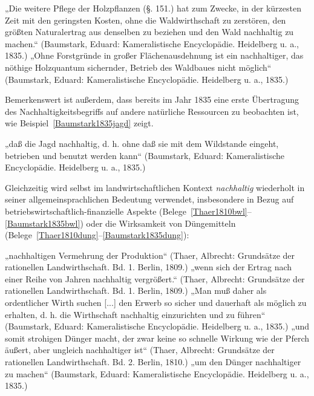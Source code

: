 \documentclass[
    german,
    a4paper,%
    12pt,%
    oneside,%
    toc=bibliography,
    final,
]{scrartcl}
\begin{document}
\begin{exe}
\ex \label{Baumstark1835forst} „Die weitere Pflege der Holzpflanzen (§. 151.) hat zum Zwecke, in der kürzesten Zeit mit den geringsten Kosten, ohne die Waldwirthschaft zu zerstören, den größten Naturalertrag aus denselben zu beziehen und den Wald nachhaltig zu machen.“ (Baumstark, Eduard: Kameralistische Encyclopädie. Heidelberg u. a., 1835.)
\ex \label{Baumstark1835forst2} „Ohne Forstgründe in großer Flächenausdehnung ist ein nachhaltiger, das nöthige Holzquantum sichernder, Betrieb des Waldbaues nicht möglich“ (Baumstark, Eduard: Kameralistische Encyclopädie. Heidelberg u. a., 1835.)
\end{exe}

Bemerkenswert ist außerdem, dass bereits im Jahr 1835 eine erste Übertragung des Nachhaltigkeitsbegriffs auf andere natürliche Ressourcen zu beobachten ist, wie Beispiel~\ref{Baumstark1835jagd} zeigt.

\begin{exe}
\ex \label{Baumstark1835jagd} „daß die Jagd nachhaltig, d. h. ohne daß sie mit dem Wildstande eingeht, betrieben und benutzt werden kann“ (Baumstark, Eduard: Kameralistische Encyclopädie. Heidelberg u. a., 1835.)
\end{exe}

Gleichzeitig wird selbst im landwirtschaftlichen Kontext \textit{nachhaltig} wiederholt in seiner allgemeinsprachlichen Bedeutung verwendet, insbesondere in Bezug auf betriebswirtschaftlich-finanzielle Aspekte (Belege~\ref{Thaer1810bwl}–\ref{Baumstark1835bwl}) oder die Wirksamkeit von Düngemitteln (Belege~\ref{Thaer1810dung}–\ref{Baumstark1835dung}):

\begin{exe}
\ex \label{Thaer1810bwl} „nachhaltigen Vermehrung der Produktion“ (Thaer, Albrecht: Grundsätze der rationellen Landwirthschaft. Bd. 1. Berlin, 1809.)
\ex „wenn sich der Ertrag nach einer Reihe von Jahren nachhaltig vergrößert.“ (Thaer, Albrecht: Grundsätze der rationellen Landwirthschaft. Bd. 1. Berlin, 1809.)
\ex \label{Baumstark1835bwl} „Man muß daher als ordentlicher Wirth suchen [...] den Erwerb so sicher und dauerhaft als möglich zu erhalten, d. h. die Wirthschaft nachhaltig einzurichten und zu führen“ (Baumstark, Eduard: Kameralistische Encyclopädie. Heidelberg u. a., 1835.)
\ex \label{Thaer1810dung} „und somit strohigen Dünger macht, der zwar keine so schnelle Wirkung wie der Pferch äußert, aber ungleich nachhaltiger ist“ (Thaer, Albrecht: Grundsätze der rationellen Landwirthschaft. Bd. 2. Berlin, 1810.)
\ex \label{Baumstark1835dung} „um den Dünger nachhaltiger zu machen“ (Baumstark, Eduard: Kameralistische Encyclopädie. Heidelberg u. a., 1835.)
\end{exe}
\end{document}
